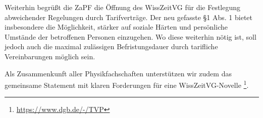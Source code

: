 \documentclass[DIV=calc]{scrartcl}
\begin{document}
Weiterhin begrüßt die ZaPF die Öffnung des WissZeitVG für die Festlegung abweichender Regelungen durch Tarifverträge.  Der neu gefasste \S 1 Abs. 1 bietet insbesondere die Möglichkeit, stärker auf soziale Härten und persönliche Umstände der betroffenen Personen einzugehen. Wo diese weiterhin nötig ist, soll jedoch auch die  maximal zulässigen Befristungsdauer durch tarifliche Vereinbarungen möglich sein.

Als Zusammenkunft aller Physikfachschaften unterstützen wir zudem das gemeinsame Statement mit klaren Forderungen für eine WissZeitVG-Novelle \footnote{\href{https://www.dgb.de/-/TVP}{https://www.dgb.de/-/TVP}}.


 











\end{document}
